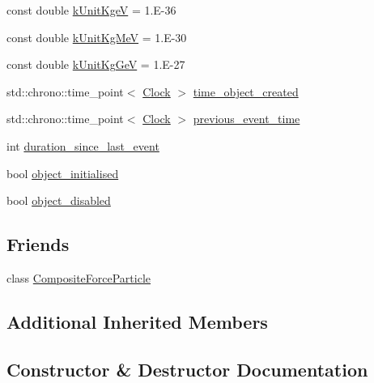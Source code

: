 \begin{DoxyCompactItemize}
const double \mbox{\hyperlink{classElementaryParticle_a4b00a86b2f7ad3165e5ea6bcd8771779}{k\+Unit\+KgeV}} = 1.\+E-\/36
\item 
const double \mbox{\hyperlink{classElementaryParticle_a423723d503eb1761a98f4495f193d63f}{k\+Unit\+Kg\+MeV}} = 1.\+E-\/30
\item 
const double \mbox{\hyperlink{classElementaryParticle_a1f3c4e9183754e2f36a14f915ec4be9b}{k\+Unit\+Kg\+GeV}} = 1.\+E-\/27
\item 
std\+::chrono\+::time\+\_\+point$<$ \mbox{\hyperlink{universe_8h_a0ef8d951d1ca5ab3cfaf7ab4c7a6fd80}{Clock}} $>$ \mbox{\hyperlink{classElementaryParticle_af7a592e44e4ccc8f1b19cd4c49ab50c3}{time\+\_\+object\+\_\+created}}
\item 
std\+::chrono\+::time\+\_\+point$<$ \mbox{\hyperlink{universe_8h_a0ef8d951d1ca5ab3cfaf7ab4c7a6fd80}{Clock}} $>$ \mbox{\hyperlink{classElementaryParticle_a8b0b30058853d850c0853fc101f5d45c}{previous\+\_\+event\+\_\+time}}
\item 
int \mbox{\hyperlink{classElementaryParticle_a7e518b7f634700ede48e59e266e09708}{duration\+\_\+since\+\_\+last\+\_\+event}}
\item 
bool \mbox{\hyperlink{classElementaryParticle_a502537989e804d20788686a29c736657}{object\+\_\+initialised}}
\item 
bool \mbox{\hyperlink{classElementaryParticle_a32f8eadc6c761d991ccaff0354af398c}{object\+\_\+disabled}}
\end{DoxyCompactItemize}
\subsection*{Friends}
\begin{DoxyCompactItemize}
\item 
class \mbox{\hyperlink{classElementaryParticle_a9bc6eb2a4c20ce83728a7c9a31b91f19}{Composite\+Force\+Particle}}
\end{DoxyCompactItemize}
\subsection*{Additional Inherited Members}


\subsection{Constructor \& Destructor Documentation}
\mbox{\label{classElementaryParticle_a4035ffd6ce053ea3390632fa530c6e21}} 
